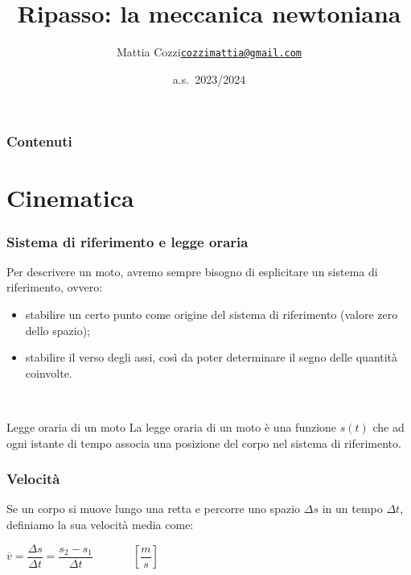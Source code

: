 \documentclass[]{beamer}
\title{Ripasso: la meccanica newtoniana}
\author{\texorpdfstring{Mattia Cozzi\newline\href{mailto:cozzimattia@gmail.com}{\texttt{cozzimattia@gmail.com}}}{Mattia Cozzi}}
\date{a.s.~2023/2024}
\theoremstyle{plain}
\begin{document}
\begin{frame}
  \titlepage
\end{frame}





\begin{frame}
\frametitle{Contenuti}
\tableofcontents
\end{frame}






\section{Cinematica}

\begin{frame}
\frametitle{Sistema di riferimento e legge oraria}
Per descrivere un moto, avremo \alert<1>{sempre} bisogno di esplicitare un sistema di riferimento, ovvero:\pause
\begin{itemize}
  \item stabilire un certo punto come \alert<2>{origine del sistema di riferimento} (valore zero dello spazio);\pause
  \item stabilire il \alert<3>{verso degli assi}, così da poter determinare il segno delle quantità coinvolte.
\end{itemize}\pause

~

\begin{block}{Legge oraria di un moto}
La legge oraria di un moto è una funzione $ s(t) $ che ad ogni istante di tempo associa una posizione del corpo nel sistema di riferimento.
\end{block}
\end{frame}


\begin{frame}
\frametitle{Velocità}
Se un corpo si muove lungo una retta e percorre uno spazio $ \Delta s $ in un tempo $ \Delta t $, definiamo la sua \alert{velocità media} come:
\begin{center}
\colorbox{blue!30}{$ \overline{v} = \dfrac{\Delta s}{\Delta t} = \dfrac{s_{2} - s_1}{\Delta t} $}~~~~~~~$ \left[ \dfrac{m}{s} \right] $
\end{center}
\end{frame}
\end{document}
